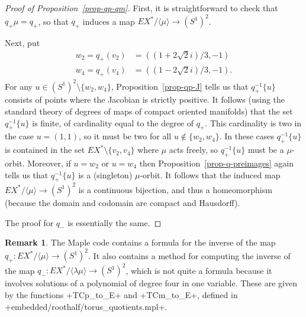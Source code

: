 \documentclass[reqno]{amsart}
\newcommand{\lm}        {\lambda}
\newcommand{\ip}[1]     {\langle #1\rangle}
\newcommand{\sm}        {\setminus}
\newcommand{\rt}        {\sqrt{2}}
\renewcommand{\:}{\colon}
\theoremstyle{definition}
\newtheorem{remark}[theorem]{Remark}
\begin{document}
\begin{proof}[Proof of Proposition~\ref{prop-qp-qm}]
 First, it is straightforward to check that $q_+\mu=q_+$, so that
 $q_+$ induces a map $EX^*/\ip{\mu}\to(S^1)^2$.

 Next, put
 \begin{align*}
  w_2 = q_+(v_2) &= ((1+2\rt i)/3,-1) \\
  w_4 = q_+(v_4) &= ((1-2\rt i)/3,-1).
 \end{align*}
 For any $u\in(S^1)^2\sm\{w_2,w_4\}$, Proposition~\ref{prop-qp-J}
 tells us that $q_+^{-1}\{u\}$ consists of points where the Jacobian
 is strictly positive.  It follows (using the standard theory of
 degrees of maps of compact oriented manifolds) that the set
 $q_+^{-1}\{u\}$ is finite, of cardinality equal to the degree of
 $q_+$.  This cardinality is two in the case $u=(1,1)$, so it must be
 two for all $u\not\in\{w_2,w_4\}$.  In these cases $q_+^{-1}\{u\}$ is
 contained in the set $EX^*\sm\{v_2,v_4\}$ where $\mu$ acts freely,
 so $q_+^{-1}\{u\}$ must be a $\mu$-orbit.  Moreover, if $u=w_2$ or
 $u=w_4$ then Proposition~\ref{prop-q-preimages} again tells us that
 $q_+^{-1}\{u\}$ is a (singleton) $\mu$-orbit.  It follows that the
 induced map $EX^*/\ip{\mu}\to(S^1)^2$ is a continuous bijection, and
 thus a homeomorphism (because the domain and codomain are compact and
 Hausdorff).

 The proof for $q_-$ is essentially the same.
\end{proof}

\begin{remark}
 The Maple code contains a formula for the inverse of the map
 $q_+\:EX^*/\ip{\mu}\to(S^1)^2$.  It also contains a method for
 computing the inverse of the map $q_-\:EX^*/\ip{\lm\mu}\to(S^1)^2$,
 which is not quite a formula because it involves solutions of a
 polynomial of degree four in one variable.  These are given by the
 functions \mcode+TCp_to_E+ and \mcode+TCm_to_E+, defined in
 \fname+embedded/roothalf/torus_quotients.mpl+.
\end{remark}
\end{document}
